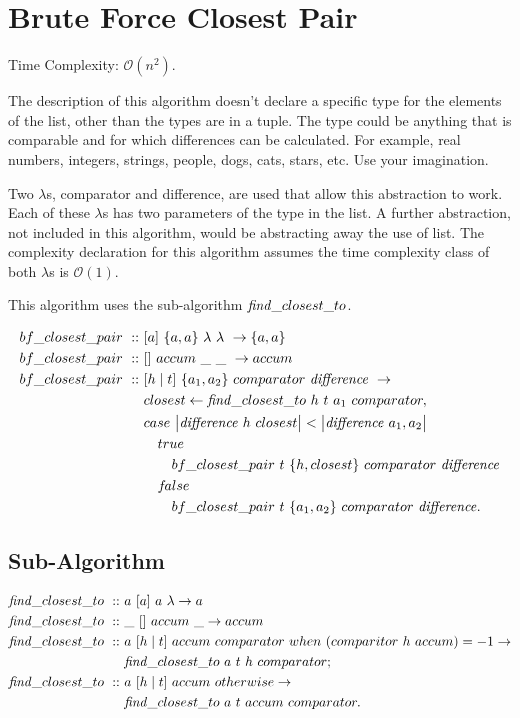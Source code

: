\documentclass[a4paper,10pt]{book}
\newcommand{\false}{f\kern-0.25ex{alse}}
\begin{document}
\section{Brute Force Closest Pair}Time Complexity: $\mathcal{O}(n^2)$.

The description of this algorithm doesn't declare a specific type for the elements of the list, other than the types are in a tuple. The type could be anything that is comparable and for which differences can be calculated. For example, real numbers, integers, strings, people, dogs, cats, stars, etc. Use your imagination. 

Two $\lambda$s, comparator and difference, are used that allow this abstraction to work. Each of these $\lambda$s has two parameters of the type in the list. A further abstraction, not included in this algorithm, would be abstracting away the use of list. The complexity declaration for this algorithm assumes the time complexity class of both $\lambda$s is $\mathcal{O}(1)$.

This algorithm uses the sub-algorithm $\text{\textit{find}}\_closest\_to$.

\begin{align*}
bf\_closest\_pair\ ::\ &[a]\ \{a,a\}\ \lambda\ \lambda\ \rightarrow \{a,a\}\\
bf\_closest\_pair\ ::\ &[]\ accum\ \_\ \_\ \rightarrow accum\\ 
bf\_closest\_pair\ ::\ &[h\mid t]\ \{a_1,a_2\}\ comparator\ \text{\textit{difference}}\ \rightarrow\\
	&closest\leftarrow \text{\textit{find}}\_closest\_to\ h\ t\ a_1\ comparator,\\
	&case\ \big | \text{\textit{difference}}\ h\ closest\big |<\big |\text{\textit{difference}}\ a_1,a_2\big |\\
	&\quad true\\
	&\qquad bf\_closest\_pair\ t\ \{h,closest\}\ comparator\ \text{\textit{difference}}\\
	&\quad\false\\
	&\qquad bf\_closest\_pair\ t\ \{a_1,a_2\}\ comparator\ \text{\textit{difference}}.\\ 
\end{align*}
\subsection{Sub-Algorithm}

\begin{align*}
\text{\textit{find}}\_closest\_to\ ::\ &a\ [a]\ a\ \lambda\rightarrow a\\
\text{\textit{find}}\_closest\_to\ ::\ &\_\ []\ accum\ \_\rightarrow accum\\
\text{\textit{find}}\_closest\_to\ ::\ &a\ [h\mid t]\ accum\ comparator\ when\ (comparitor\ h\ accum) = -1\rightarrow\\
	&\text{\textit{find}}\_closest\_to\ a\ t\ h\ comparator;\\
\text{\textit{find}}\_closest\_to\ ::\ &a\ [h\mid t]\ accum\ otherwise\rightarrow\\
	&\text{\textit{find}}\_closest\_to\ a\ t\ accum\ comparator.
\end{align*}
\end{document}
